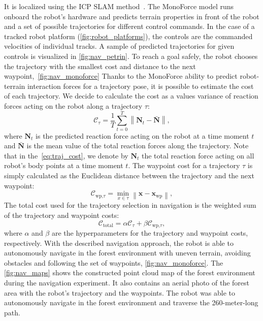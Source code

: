 It is localized using the ICP SLAM method~\cite{Pomerleau-2013-AR}.
The MonoForce model runs onboard the robot's hardware and predicts terrain properties in front of the robot and a set of possible trajectories for different control commands.
In the case of a tracked robot platform (\autoref{fig:robot_platforms}), the controls are the commanded velocities of individual tracks.
A sample of predicted trajectories for given controls is visualized in \autoref{fig:nav_petrin}.
To reach a goal safely, the robot chooses the trajectory with the smallest cost and distance to the next waypoint,~\autoref{fig:nav_monoforce}
Thanks to the MonoForce ability to predict robot-terrain interaction forces for a trajectory pose,
it is possible to estimate the cost of each trajectory.
We decide to calculate the cost as a values variance of reaction forces acting on the robot along a trajectory $\tau$:
\begin{equation}
    \label{eq:traj_cost}
    \mathcal{C}_{\tau} = \frac{1}{T}\sum_{t=0}^{T}\left\|\mathbf{N}_t - \mathbf{\bar{N}}\right\|,
\end{equation}
where $\mathbf{N}_t$ is the predicted reaction force acting on the robot at a time moment $t$
and $\mathbf{\bar{N}}$ is the mean value of the total reaction forces along the trajectory.
Note that in the~\eqref{eq:traj_cost}, we denote
by $\mathbf{N}_t$ the total reaction force acting on all robot's body points at a time moment $t$.
The waypoint cost for a trajectory $\tau$ is simply calculated as the Euclidean distance between the trajectory and the next waypoint:
\begin{equation}
    \label{eq:waypoint_cost}
    \mathcal{C}_{\text{wp,$\tau$}} = \min_{x \in \tau}\left\|\mathbf{x} - \mathbf{x}_{\text{wp}}\right\|,
\end{equation}
The total cost used for the trajectory selection in navigation is the weighted sum of the trajectory and waypoint costs:
\begin{equation}
    \label{eq:total_cost}
    \mathcal{C}_{\text{total}} = \alpha \mathcal{C}_{\tau} + \beta \mathcal{C}_{\text{wp,$\tau$}},
\end{equation}
where $\alpha$ and $\beta$ are the hyperparameters for the trajectory and waypoint costs, respectively.
With the described navigation approach, the robot is able to autonomously navigate in the forest environment with uneven terrain,
avoiding obstacles and following the set of waypoints, \autoref{fig:nav_monoforce}.
The \autoref{fig:nav_maps} shows the constructed point cloud map of the forest environment during the navigation experiment.
It also contains an aerial photo of the forest area with the robot's trajectory and the waypoints.
The robot was able to autonomously navigate in the forest environment and traverse the 260-meter-long path.
